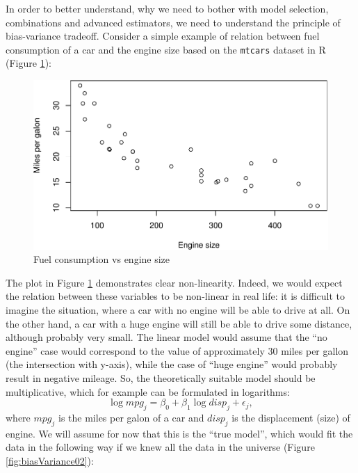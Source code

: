 \documentclass[
]{book}
\newenvironment{Shaded}{\begin{snugshade}}{\end{snugshade}}
\newcommand{\DataTypeTok}[1]{\textcolor[rgb]{0.13,0.29,0.53}{#1}}
\newcommand{\KeywordTok}[1]{\textcolor[rgb]{0.13,0.29,0.53}{\textbf{#1}}}
\newcommand{\NormalTok}[1]{#1}
\newcommand{\OperatorTok}[1]{\textcolor[rgb]{0.81,0.36,0.00}{\textbf{#1}}}
\newcommand{\StringTok}[1]{\textcolor[rgb]{0.31,0.60,0.02}{#1}}
\theoremstyle{definition}
\theoremstyle{definition}
\theoremstyle{definition}
\theoremstyle{definition}
\theoremstyle{remark}
\begin{document}
In order to better understand, why we need to bother with model selection, combinations and advanced estimators, we need to understand the principle of bias-variance tradeoff. Consider a simple example of relation between fuel consumption of a car and the engine size based on the \texttt{mtcars} dataset in R (Figure \ref{fig:biasVariance01}):

\begin{Shaded}
\end{Shaded}

\begin{figure}
\centering
\includegraphics{Svetunkov---Statistics-for-Business-Analytics_files/figure-latex/biasVariance01-1.pdf}
\caption{\label{fig:biasVariance01}Fuel consumption vs engine size}
\end{figure}

The plot in Figure \ref{fig:biasVariance01} demonstrates clear non-linearity. Indeed, we would expect the relation between these variables to be non-linear in real life: it is difficult to imagine the situation, where a car with no engine will be able to drive at all. On the other hand, a car with a huge engine will still be able to drive some distance, although probably very small. The linear model would assume that the ``no engine'' case would correspond to the value of approximately 30 miles per gallon (the intersection with y-axis), while the case of ``huge engine'' would probably result in negative mileage. So, the theoretically suitable model should be multiplicative, which for example can be formulated in logarithms:
\begin{equation}
    \log mpg_j = \beta_0 + \beta_1 \log disp_j + \epsilon_j ,
    \label{eq:mpgLinear}
\end{equation}
where \(mpg_j\) is the miles per galon of a car and \(disp_j\) is the displacement (size) of engine. We will assume for now that this is the ``true model'', which would fit the data in the following way if we knew all the data in the universe (Figure \ref{fig:biasVariance02}):
\end{document}
